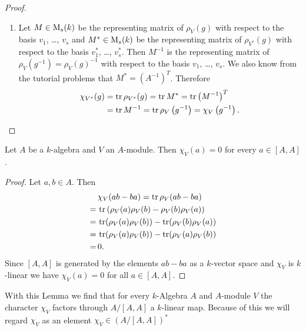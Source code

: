 \begin{proof}
\begin{enumerate}[label=\emph{\alph*)},leftmargin=*]
    \item
      Let $M \in \operatorname{M}_s(k)$ be the representing matrix of $\rho_V(g)$ with respect to the basis $v_1$, \dots, $v_s$ and $M^* \in \operatorname{M}_s(k)$ be the representing matrix of $\rho_{V^*}(g)$ with respect to the basis $v_1^*$, \dots, $v_s^*$. Then $M^{-1}$ is the representing matrix of $\rho_V(g^{-1}) = \rho_V(g)^{-1}$ with respect to the basis $v_1$, \dots, $v_s$. We also know from the tutorial problems that $M^* = \left(A^{-1}\right)^T$. Therefore
      \begin{align*}
        \chi_{V^*}(g)
        &= \operatorname{tr} \rho_{V^*}(g)
        = \operatorname{tr} M^*
        = \operatorname{tr} \left(M^{-1}\right)^T \\
        &= \operatorname{tr} M^{-1}
        = \operatorname{tr} \rho_V\left( g^{-1} \right)
        = \chi_V\left( g^{-1} \right).
        \qedhere
      \end{align*}
  \end{enumerate}
\end{proof}


\begin{lem}
  Let $A$ be a $k$-algebra and $V$ an $A$-module. Then $\chi_V(a) = 0$ for every $a \in [A,A]$.
\end{lem}
\begin{proof}
  Let $a, b \in A$. Then
  \begin{align*}
      &\, \chi_V(ab-ba)
    =    \operatorname{tr} \rho_V(ab-ba) \\
    =&\, \operatorname{tr}\left( \rho_V(a)\rho_V(b)-\rho_V(b)\rho_V(a) \right) \\
    =&\, \operatorname{tr}(\rho_V(a)\rho_V(b)) - \operatorname{tr}(\rho_V(b)\rho_V(a)) \\
    =&\, \operatorname{tr}(\rho_V(a)\rho_V(b)) - \operatorname{tr}(\rho_V(a)\rho_V(b)) \\
    =&\, 0.
  \end{align*}
  Since $[A,A]$ is generated by the elements $ab-ba$ as a $k$-vector space and $\chi_V$ is $k$-linear we have $\chi_V(a) = 0$ for all $a \in [A,A]$.
\end{proof}


With this Lemma we find that for every $k$-Algebra $A$ and $A$-module $V$ the character $\chi_V$ factors through $A/[A,A]$ a $k$-linear map. Because of this we will regard $\chi_V$ as an element $\chi_V \in (A/[A,A])^*$


